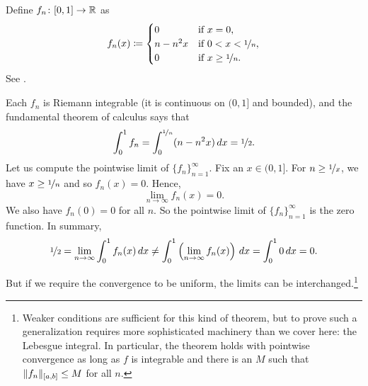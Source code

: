\begin{example}
Define $f_n \colon [0,1] \to {\mathbb{R}}$ as
\begin{equation*}
f_n(x) \coloneqq
\begin{cases}
0 &  \text{if } x = 0,\\
n-n^2x &  \text{if } 0 < x < \nicefrac{1}{n},\\
0 &  \text{if } x \geq \nicefrac{1}{n}.
\end{cases}
\avoidbreak
\end{equation*}
See .

\begin{myfigureht}
\caption{Graph of $f_n(x)$.%
\label{intconvcntr:fig}}
\end{myfigureht}

Each $f_n$ is Riemann integrable (it is continuous on $(0,1]$ and bounded),
and the fundamental theorem of calculus says that
\begin{equation*}
\int_0^1 f_n =
\int_0^{\nicefrac{1}{n}} (n-n^2x)\,dx = \nicefrac{1}{2} .
\end{equation*}
Let us compute the pointwise limit of $\{ f_n \}_{n=1}^\infty$.
Fix an $x \in (0,1]$.  For $n \geq \nicefrac{1}{x}$,
we have $x \geq \nicefrac{1}{n}$ and so $f_n(x) = 0$.  Hence,
\begin{equation*}
\lim_{n \to \infty} f_n(x) = 0.
\end{equation*}
We also have $f_n(0) = 0$ for all $n$.  So the pointwise
limit of $\{ f_n \}_{n=1}^\infty$ is the zero function.
In summary,
\begin{equation*}
\nicefrac{1}{2} =
\lim_{n\to\infty}
\int_0^1 f_n (x)\,dx
\neq
\int_0^1
\left(
\lim_{n\to\infty}
f_n(x)\right)\,dx
=
\int_0^1 0\,dx = 0 .
\end{equation*}
\end{example}

But if we require the convergence to be uniform, the limits can
be interchanged.\footnote{Weaker conditions
are sufficient for this kind of theorem, but to prove such a generalization requires
more sophisticated machinery than we cover here: the Lebesgue integral.
In particular, the theorem holds with pointwise
convergence as long as $f$ is integrable and there is an $M$ such that
$\lVert {f_n} \rVert_{[a,b]} \leq M$ for all $n$.}

